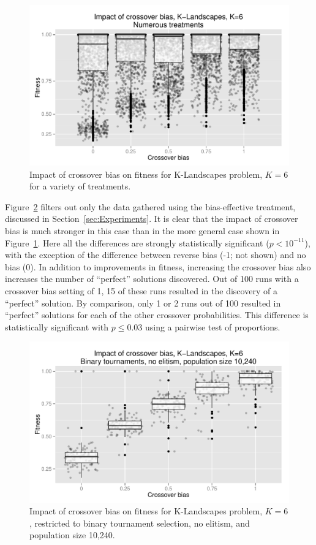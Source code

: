 \documentclass{sig-alternate}
\begin{document}
\begin{figure}
\centering
\includegraphics[width=0.45 \textwidth]{Plots/KLandscapes6_XO_bias_impact_transformed_boxplot_alpha075.pdf}
\caption{Impact of crossover bias on fitness for K-Landscapes problem, $K=6$ for a variety of treatments.}
\label{fig:KLandscapes6_results}
\end{figure}

Figure~\ref{fig:KLandscapes6_strong_results} filters out only the data gathered using the bias-effective treatment,
discussed in Section~\ref{sec:Experiments}. It is clear that the impact of crossover bias is much stronger in this case
than in the more general case shown in Figure~\ref{fig:KLandscapes6_results}. Here all the differences are strongly
statistically significant ($p < 10^{-11}$), with the exception of the difference between reverse bias (-1; not shown)
and no bias (0). In addition to improvements in fitness, increasing the crossover bias also increases the number of
``perfect'' solutions discovered. Out of 100 runs with a crossover bias setting of 1, 15 of these runs resulted in the
discovery of a ``perfect'' solution. By comparison, only 1 or 2 runs out of 100 resulted in ``perfect'' solutions for
each of the other crossover probabilities. This difference is statistically significant with $p \leq 0.03$ using a
pairwise test of proportions.

\begin{figure}
\centering
\includegraphics[width=0.45 \textwidth]{Plots/KLandscapes6_XO_bias_strong_impact_alpha_075.pdf}
\caption{Impact of crossover bias on fitness for K-Landscapes problem, $K=6$, restricted to binary tournament 
selection, no elitism, and population size 10,240.}
\label{fig:KLandscapes6_strong_results}
\end{figure}
\end{document}
